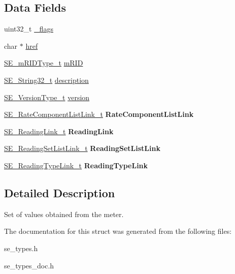 \subsection*{Data Fields}
\begin{DoxyCompactItemize}
\item 
uint32\+\_\+t \hyperlink{group__MeterReading_gad50fcf205c0820ea247fdbbb80b37059}{\+\_\+flags}
\item 
char $\ast$ \hyperlink{group__MeterReading_ga30eb76165fc6629c2c745e52f5fb3a43}{href}
\item 
\hyperlink{group__mRIDType_gac74622112f3a388a2851b2289963ba5e}{S\+E\+\_\+m\+R\+I\+D\+Type\+\_\+t} \hyperlink{group__MeterReading_ga53cdec433d7f97a25a229b7bd70be53e}{m\+R\+ID}
\item 
\hyperlink{group__String32_gac9f59b06b168b4d2e0d45ed41699af42}{S\+E\+\_\+\+String32\+\_\+t} \hyperlink{group__MeterReading_ga1d70f306503559815110dbf7512e1997}{description}
\item 
\hyperlink{group__VersionType_ga4b8d27838226948397ed99f67d46e2ae}{S\+E\+\_\+\+Version\+Type\+\_\+t} \hyperlink{group__MeterReading_ga5c1340f98b639840610b8b0ec3fd0eaa}{version}
\item 
\hyperlink{structSE__RateComponentListLink__t}{S\+E\+\_\+\+Rate\+Component\+List\+Link\+\_\+t} {\bfseries Rate\+Component\+List\+Link}
\item 
\hyperlink{structSE__ReadingLink__t}{S\+E\+\_\+\+Reading\+Link\+\_\+t} {\bfseries Reading\+Link}
\item 
\hyperlink{structSE__ReadingSetListLink__t}{S\+E\+\_\+\+Reading\+Set\+List\+Link\+\_\+t} {\bfseries Reading\+Set\+List\+Link}
\item 
\hyperlink{structSE__ReadingTypeLink__t}{S\+E\+\_\+\+Reading\+Type\+Link\+\_\+t} {\bfseries Reading\+Type\+Link}
\end{DoxyCompactItemize}


\subsection{Detailed Description}
Set of values obtained from the meter. 

The documentation for this struct was generated from the following files\+:\begin{DoxyCompactItemize}
\item 
se\+\_\+types.\+h\item 
se\+\_\+types\+\_\+doc.\+h\end{DoxyCompactItemize}
